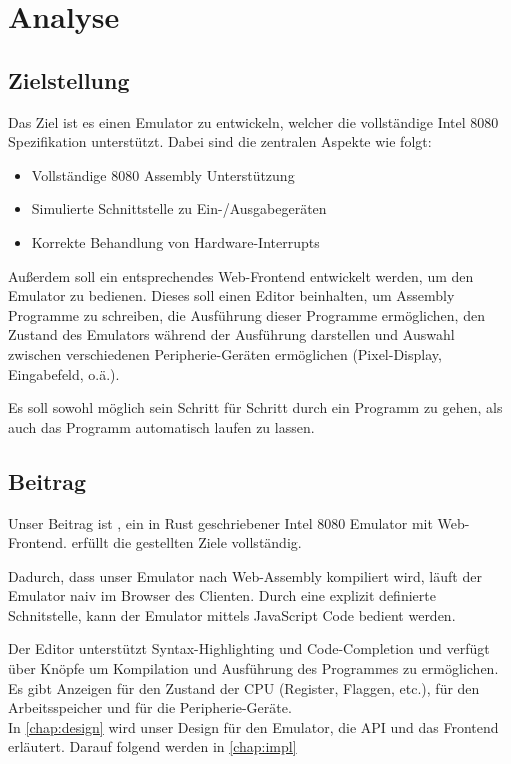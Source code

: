 \chapter{Analyse}

\section{Zielstellung}\label{goals}

Das Ziel ist es einen Emulator zu entwickeln, welcher die vollständige Intel 8080 Spezifikation unterstützt. Dabei sind die zentralen Aspekte wie folgt:

\begin{itemize}
    \item Vollständige 8080 Assembly Unterstützung
    \item Simulierte Schnittstelle zu Ein-/Ausgabegeräten
    \item Korrekte Behandlung von Hardware-Interrupts
\end{itemize}



Außerdem soll ein entsprechendes Web-Frontend entwickelt werden, um den Emulator zu bedienen.
Dieses soll einen Editor beinhalten, um Assembly Programme zu schreiben, die Ausführung dieser Programme ermöglichen, den Zustand des Emulators während der Ausführung darstellen und Auswahl zwischen verschiedenen Peripherie-Geräten ermöglichen (Pixel-Display, Eingabefeld, o.ä.). 

Es soll sowohl möglich sein Schritt für Schritt durch ein Programm zu gehen, als auch das Programm automatisch laufen zu lassen.

\section{Beitrag}

Unser Beitrag ist \Emu, ein in Rust geschriebener Intel 8080 Emulator mit Web-Frontend. \Emu erfüllt die gestellten Ziele vollständig.

Dadurch, dass unser Emulator nach Web-Assembly kompiliert wird, läuft der Emulator naiv im Browser des Clienten. Durch eine explizit definierte Schnitstelle, kann der Emulator mittels JavaScript Code bedient werden.

Der Editor unterstützt Syntax-Highlighting und Code-Completion und verfügt über Knöpfe um Kompilation und Ausführung des Programmes zu ermöglichen.
Es gibt Anzeigen für den Zustand der CPU (Register, Flaggen, etc.), für den Arbeitsspeicher und für die Peripherie-Geräte.\\

In \cref{chap:design} wird unser Design für den Emulator, die API und das Frontend
erläutert. Darauf folgend werden in \cref{chap:impl}
